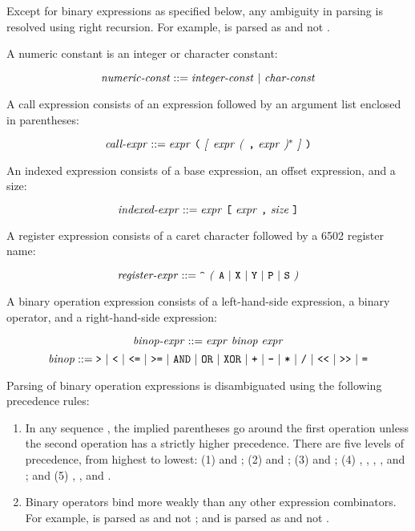 \documentclass[10pt]{article}
\begin{document}
\noindent
Except for binary expressions as specified below, any ambiguity in
parsing is resolved using right recursion.  For example,  is
parsed as  and not .

  A numeric constant is an integer or
character constant:

$$\mbox{\textit{numeric-const}} ::= \mbox{\ensuremath{\mbox{\textit{integer-const}}} $|$
  \ensuremath{\mbox{\textit{char-const}}}}$$

 A call expression consists of an expression
followed by an argument list enclosed in parentheses:

$$\mbox{\textit{call-expr}} ::= \mbox{\ensuremath{\mbox{\textit{expr}}} \texttt{(}
  \textit{[} \ensuremath{\mbox{\textit{expr}}} \textit{(} \texttt{,} \ensuremath{\mbox{\textit{expr}}} \textit{)}$^*$ \textit{]} \texttt{)}}$$

 An indexed expression consists of a
base expression, an offset expression, and a size:

$$\mbox{\textit{indexed-expr}} ::= \mbox{\ensuremath{\mbox{\textit{expr}}} \texttt{[}
    \ensuremath{\mbox{\textit{expr}}} \texttt{,} \ensuremath{\mbox{\textit{size}}} \texttt{]}}$$

 A register expression consists of a
caret character followed by a 6502 register name:

$$\mbox{\textit{register-expr}} ::= \mbox{\texttt{\textasciicircum} \textit{(} \texttt{A} $|$
    \texttt{X} $|$ \texttt{Y} $|$ \texttt{P} $|$ \texttt{S} \textit{)}}$$

 A binary operation expression
consists of a left-hand-side expression, a binary operator, and a
right-hand-side expression:

$$\mbox{\textit{binop-expr}} ::= \mbox{\ensuremath{\mbox{\textit{expr}}} \ensuremath{\mbox{\textit{binop}}} \ensuremath{\mbox{\textit{expr}}}}$$
%
$$\mbox{\textit{binop}} ::= \mbox{\texttt{>} $|$ \texttt{<} $|$ \texttt{<=} $|$
  \texttt{>=} $|$ \texttt{AND} $|$ \texttt{OR} $|$ \texttt{XOR} $|$ \texttt{+} $|$
  \texttt{-} $|$ \texttt{*} $|$ \texttt{/} $|$ \texttt{<}\texttt{<}~$|$ \texttt{>}\texttt{>}~$|$
  \texttt{=}}$$

\noindent
Parsing of binary operation expressions is disambiguated using the
following precedence rules:

\begin{enumerate}
%
\item In any sequence  
    , the implied
  parentheses go around the first operation unless the second
  operation has a strictly higher precedence.  There are five levels
  of precedence, from highest to lowest: (1) \kwd{<}\kwd{<} and \kwd{>}\kwd{>};
  (2) \kwd{*} and \kwd{\bs}; (3) \kwd{+} and \kwd{-}; (4) \kwd{=},
  \kwd{>}, \kwd{<}, \kwd{<=}, and \kwd{>=}; and (5) ,
  , and .
%
\item Binary operators bind more weakly than any other expression
  combinators.  For example,  is parsed as 
  and not ; and  is parsed as  and
  not .
%
\end{enumerate}
\end{document}
